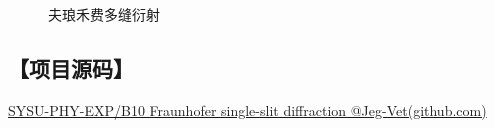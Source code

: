 \documentclass[12pt,a4paper,UTF8]{ctexart}
\begin{document}
\begin{figure}[htbp]
	\caption{夫琅禾费多缝衍射}
	\label{fig:5}
\end{figure}

\subsection*{【项目源码】}
\href{https://github.com/Jeg-Vet/SYSU-PHY-EXP/tree/main/B10-Fraunhofer_single-slit_diffraction}{SYSU-PHY-EXP/B10 Fraunhofer single-slit diffraction @Jeg-Vet(github.com)}
\end{document}
